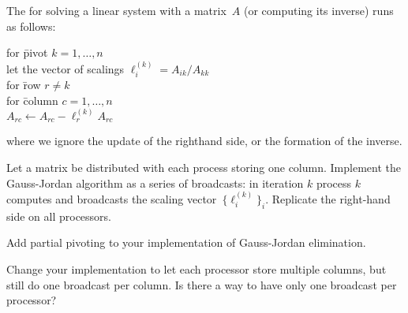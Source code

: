 \begin{exercise}
  \label{ex:gaussjordancoll}
  The  for solving a linear system
  with a matrix~$A$ (or computing its inverse) runs as follows:
  {\small
  \begin{tabbing}
    for \=pivot $k=1,\ldots,n$\\
    \>let the vector of scalings $\ell^{(k)}_i=A_{ik}/A_{kk}$\\
    \>for \=row $r\not=k$\\
    \>\>for \=column $c=1,\ldots,n$\\
    \>\>\> $A_{rc}\leftarrow A_{rc} - \ell^{(k)}_r A_{rc}$\\
  \end{tabbing}
  }
  where we ignore the update of the righthand side, or the formation
  of the inverse.

  Let a matrix be distributed with each process storing one
  column. Implement the Gauss-Jordan algorithm as a series of
  broadcasts: in iteration $k$ process $k$ computes and broadcasts the
  scaling vector~$\{\ell^{(k)}_i\}_i$. Replicate the right-hand side on
  all processors.
\end{exercise}

\begin{exercise}
  Add partial pivoting to your implementation of Gauss-Jordan elimination.

  Change your implementation to let each processor store multiple columns,
  but still do one broadcast per column. Is there a way to have only one
  broadcast per processor?
\end{exercise}

